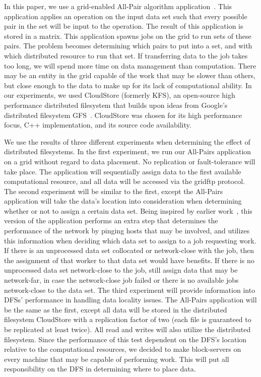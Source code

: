 \documentclass[a4paper,11pt]{article}
\begin{document}
In this paper, we use a grid-enabled All-Pair algorithm application~\cite{Interop}. This application applies an operation on the input data set such that every possible pair in the set will be input to the operation. The result of this application is stored in a matrix. This application spawns jobs on the grid to run sets of these pairs. The problem becomes determining which pairs to put into a set, and with which distributed resource to run that set. If transferring data to the job takes too long, we will spend more time on data management than computation. There may be an entity in the grid capable of the work that may be slower than others, but close enough to the data to make up for its lack of computational ability. In our experiments, we used CloudStore (formerly KFS), an open-source high performance distributed filesystem that builds upon ideas from Google's distributed filesystem GFS~\cite{kfs_web}. CloudStore was chosen for its high performance focus, C++ implementation, and its source code availability.

We use the results of three different experiments when determining the effect of distributed filesystems. In the first experiment, we run our All-Pairs application on a grid without regard to data placement. No replication or fault-tolerance will take place. The application will sequentially assign data to the first available computational resource, and all data will be accessed via the gridftp protocol. The second experiment will be similar to the first, except the All-Pairs application will take the data's location into consideration when determining whether or not to assign a certain data set. Being inspired by earlier work~\cite{netperf}, this version of the application performs an extra step that determines the performance of the network by pinging hosts that may be involved, and utilizes this information when deciding which data set to assign to a job requesting work. If there is an unprocessed data set collocated or network-close with the job, then the assignment of that worker to that data set would have benefits. If there is no unprocessed data set network-close to the job, still assign data that may be network-far, in case the network-close job failed or there is no available jobs network-close to the data set. The third experiment will provide information into DFSs' performance in handling data locality issues. The All-Pairs application will be the same as the first, except all data will be stored in the distributed filesystem CloudStore with a replication factor of two (each file is guaranteed to be replicated at least twice). All read and writes will also utilize the distributed filesystem. Since the performance of this test dependent on the DFS's location relative to the computational resources, we decided to make block-servers on every machine that may be capable of performing work. This will put all responsibility on the DFS in determining where to place data.
\end{document}
